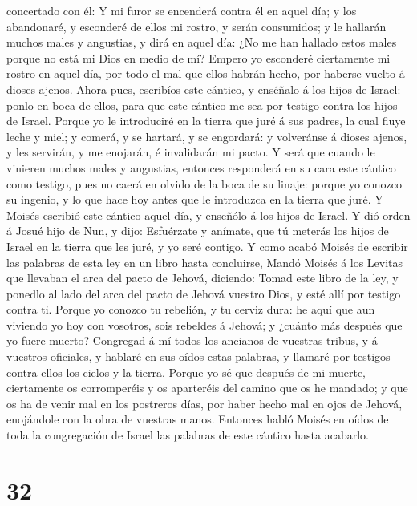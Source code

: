 concertado con él:  Y mi furor se encenderá contra él en
aquel día; y los abandonaré, y esconderé de ellos mi rostro, y serán
consumidos; y le hallarán muchos males y angustias, y dirá en aquel día:
¿No me han hallado estos males porque no está mi Dios en medio de mí?
 Empero yo esconderé ciertamente mi rostro en aquel día,
por todo el mal que ellos habrán hecho, por haberse vuelto á dioses
ajenos.  Ahora pues, escribíos este cántico, y enséñalo á
los hijos de Israel: ponlo en boca de ellos, para que este cántico me
sea por testigo contra los hijos de Israel.  Porque yo le
introduciré en la tierra que juré á sus padres, la cual fluye leche y
miel; y comerá, y se hartará, y se engordará: y volveránse á dioses
ajenos, y les servirán, y me enojarán, é invalidarán mi pacto.
 Y será que cuando le vinieren muchos males y angustias,
entonces responderá en su cara este cántico como testigo, pues no caerá
en olvido de la boca de su linaje: porque yo conozco su ingenio, y lo
que hace hoy antes que le introduzca en la tierra que juré.
 Y Moisés escribió este cántico aquel día, y enseñólo á
los hijos de Israel.  Y dió orden á Josué hijo de Nun, y
dijo: Esfuérzate y anímate, que tú meterás los hijos de Israel en la
tierra que les juré, y yo seré contigo.  Y como acabó
Moisés de escribir las palabras de esta ley en un libro hasta
concluirse,  Mandó Moisés á los Levitas que llevaban el
arca del pacto de Jehová, diciendo:  Tomad este libro de
la ley, y ponedlo al lado del arca del pacto de Jehová vuestro Dios, y
esté allí por testigo contra ti.  Porque yo conozco tu
rebelión, y tu cerviz dura: he aquí que aun viviendo yo hoy con
vosotros, sois rebeldes á Jehová; y ¿cuánto más después que yo fuere
muerto?  Congregad á mí todos los ancianos de vuestras
tribus, y á vuestros oficiales, y hablaré en sus oídos estas palabras, y
llamaré por testigos contra ellos los cielos y la tierra.
 Porque yo sé que después de mi muerte, ciertamente os
corromperéis y os aparteréis del camino que os he mandado; y que os ha
de venir mal en los postreros días, por haber hecho mal en ojos de
Jehová, enojándole con la obra de vuestras manos. 
Entonces habló Moisés en oídos de toda la congregación de Israel las
palabras de este cántico hasta acabarlo.

\hypertarget{section-31}{%
\section{32}\label{section-31}}

